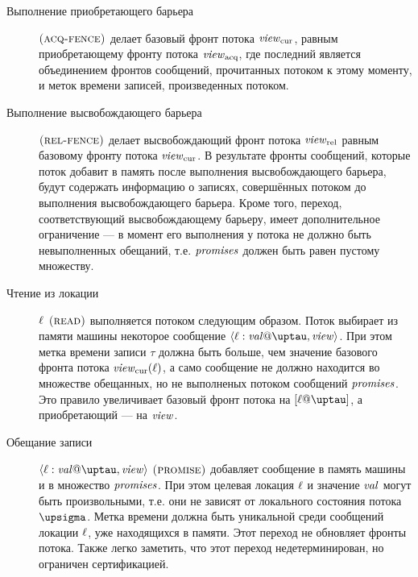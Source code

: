 \begin{description}
  \item[Выполнение приобретающего барьера] $\textsc{(acq-fence)}$
    делает базовый фронт потока $\mathit{view}_{\mathrm{cur}}$, равным приобретающему фронту потока $\mathit{view}_{\mathrm{acq}}$,
    где последний является объединением фронтов сообщений, прочитанных потоком к этому моменту, и меток времени записей,
    произведенных потоком.

  \item[Выполнение высвобождающего барьера] $\textsc{(rel-fence)}$
    делает высвобождающий фронт потока $\mathit{view}_{\mathrm{rel}}$ равным базовому фронту потока $\mathit{view}_{\mathrm{cur}}$.
    В результате фронты сообщений, которые поток добавит в память после выполнения высвобождающего барьера, будут содержать
    информацию о записях, совершённых потоком до выполнения высвобождающего барьера.
    Кроме того, переход, соответствующий высвобождающему барьеру, имеет дополнительное ограничение --- в момент его выполнения
    у потока не должно быть невыполненных обещаний, т.е. $\mathit{promises}$ должен быть равен пустому множеству.
  
  \item[Чтение из локации] $\ell$ $\textsc{(read)}$ выполняется потоком следующим образом.
    Поток выбирает из памяти машины некоторое сообщение $\writeEvt{\loc}{\stval}{\tau}{\R}$.
    При этом метка времени записи $\tau$ должна
    быть больше, чем значение базового фронта потока $\mathit{view}_{\mathrm{cur}}(\ell)$, а само сообщение не должно находится
    во множестве обещанных, но не выполненых потоком сообщений $\mathit{promises}$.
    Это правило увеличивает базовый фронт потока на $[\loc@\tau]$, а приобретающий --- на $\mathit{view}$.
    
  \item[Обещание записи] $\writeEvt{\loc}{\stval}{\tau}{\R}$ $\textsc{(promise)}$ добавляет сообщение в память машины и
    в множество $\mathit{promises}$. При этом целевая локация $\ell$ и значение $\mathit{val}$ могут быть
    произвольными, т.е. они не зависят от локального состояния потока $\pstate$.
    Метка времени должна быть уникальной среди сообщений локации $\ell$, уже находящихся в памяти.
    Этот переход не обновляет фронты потока. Также легко заметить, что этот переход
    недетерминирован, но ограничен сертификацией.
    

\end{description}
